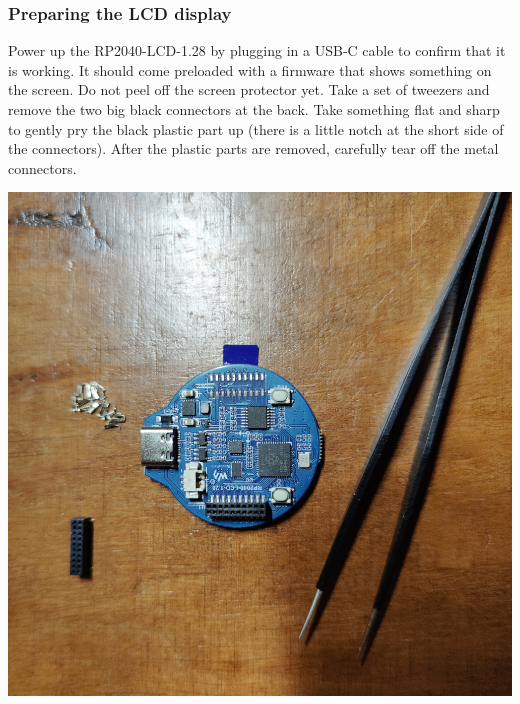 \documentclass[]{article}
\begin{document}
\subsubsection{Preparing the LCD display}
\begin{minipage}[t]{0.5\linewidth}
	\vspace{0pt}
	Power up the RP2040-LCD-1.28 by plugging in a USB-C cable to confirm that it is working. It should come preloaded with a firmware that shows something on the screen. Do not peel off the screen protector yet. Take a set of tweezers and remove the two big black connectors at the back. Take something flat and sharp to gently pry the black plastic part up (there is a little notch at the short side of the connectors). After the plastic parts are removed, carefully tear off the metal connectors.
\end{minipage}
\hfill
\begin{minipage}[t]{0.4\linewidth}
	\vspace{0pt}
	\includegraphics[width=\linewidth]{images/01_displayunit/01_remove_connectors.jpg}
\end{minipage}
\end{document}
